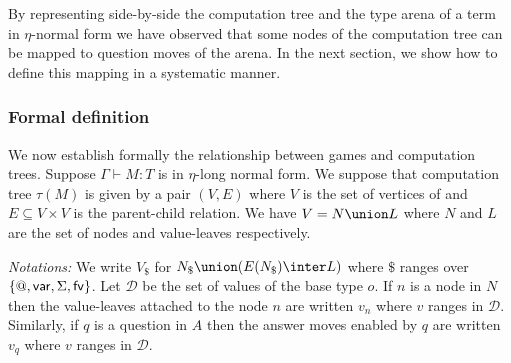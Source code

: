 By representing side-by-side the computation tree and the type arena of a term in $\eta$-normal form we have observed
that some nodes of the computation tree can be mapped to question moves of the arena.
In the next section, we show how to define this mapping in a systematic manner.

\subsubsection{Formal definition}

We now establish formally the relationship between games and
computation trees. Suppose $\Gamma \vdash M : T$ is in $\eta$-long
normal form. We suppose that computation tree $\tau(M)$ is given by
a pair $(V,E)$ where $V$ is the set of vertices of and $E \subseteq
V \times V$ is the parent-child relation. We have $V = N \union L$
where $N$ and $L$ are the set of nodes and value-leaves
respectively.

\emph{Notations:} We write $V_\$$ for $N_\$ \union (E(N_\$) \inter
L)$ where $\$$ ranges over $\{@, {\sf var}, \Sigma, {\sf fv} \}$.
Let $\mathcal{D}$ be the set of values of the base type $o$. If $n$
is a node in $N$ then the value-leaves attached to the node $n$ are
written $v_n$ where $v$ ranges in $\mathcal{D}$. Similarly, if $q$
is a question in $A$ then the answer moves enabled by $q$ are
written $v_q$ where $v$ ranges in $\mathcal{D}$.


